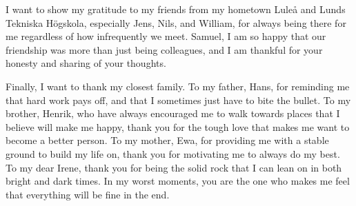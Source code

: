 \noindent I want to show my gratitude to my friends from my hometown Luleå and Lunds Tekniska Högskola, especially Jens, Nils, and William, for always being there for me regardless of how infrequently we meet. Samuel, I am so happy that our friendship was more than just being colleagues, and I am thankful for your honesty and sharing of your thoughts.   
\newline    

\noindent Finally, I want to thank my closest family. To my father, Hans, for reminding me that hard work pays off, and that I sometimes just have to bite the bullet. To my brother, Henrik, who have always encouraged me to walk towards places that I believe will make me happy, thank you for the tough love that makes me want to become a better person. To my mother, Ewa, for providing me with a stable ground to build my life on, thank you for motivating me to always do my best. To my dear Irene, thank you for being the solid rock that I can lean on in both bright and dark times. In my worst moments, you are the one who makes me feel that everything will be fine in the end.
\newline    




